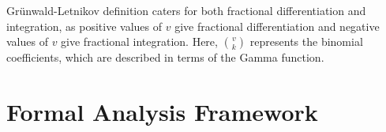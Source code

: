 \documentclass {llncs}
\begin{document}
\noindent Gr\"{u}nwald-Letnikov definition  caters for both  fractional differentiation and integration, as positive values of $v$ give fractional differentiation and negative values of $v$ give fractional integration. Here, ${v\choose k}$ represents the binomial coefficients, which are described in terms of the Gamma function.













\section{Formal Analysis Framework} \label{sec:formal_analysis}
\end{document}
